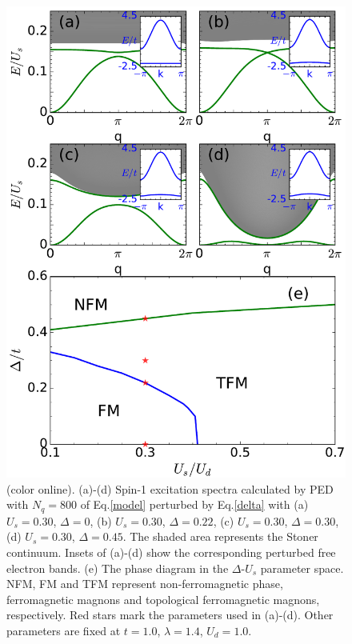 \documentclass[amsmath,superscriptaddress,showpacs,aps,prb,twocolumn]{revtex4-1}
\begin{document}
\begin{figure}
\includegraphics[scale=0.46]{delta_spectrum}
\caption{(color online). (a)-(d) Spin-1 excitation spectra calculated by PED with $N_q=800$ of Eq.\ref{model} perturbed by Eq.\ref{delta} with (a) $U_s=0.30$, $\Delta=0$, (b) $U_s=0.30$, $\Delta=0.22$, (c) $U_s=0.30$, $\Delta=0.30$, (d) $U_s=0.30$, $\Delta=0.45$. The shaded area represents the Stoner continuum. Insets of (a)-(d) show the corresponding perturbed free electron bands. (e) The phase diagram in the $\Delta$-$U_s$ parameter space. NFM, FM and TFM represent non-ferromagnetic phase, ferromagnetic magnons and topological ferromagnetic magnons, respectively. Red stars mark the parameters used in (a)-(d). Other parameters are fixed at $t=1.0$, $\lambda=1.4$, $U_d=1.0$.}
\label{dspectrum}
\end{figure}
\end{document}
